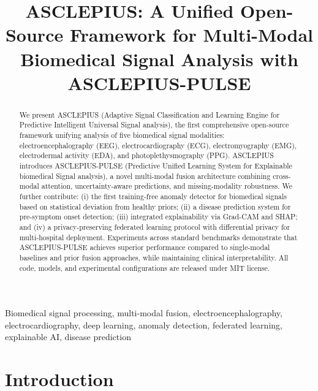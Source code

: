 \documentclass[journal]{IEEEtran}
\begin{document}
\title{ASCLEPIUS: A Unified Open-Source Framework for Multi-Modal\\
Biomedical Signal Analysis with ASCLEPIUS-PULSE}

\author{
}

\maketitle

\begin{abstract}
We present ASCLEPIUS (Adaptive Signal Classification and Learning Engine for
Predictive Intelligent Universal Signal analysis), the first comprehensive
open-source framework unifying analysis of five biomedical signal modalities:
electroencephalography (EEG), electrocardiography (ECG), electromyography
(EMG), electrodermal activity (EDA), and photoplethysmography (PPG).
ASCLEPIUS introduces ASCLEPIUS-PULSE (Predictive Unified Learning System for
Explainable biomedical Signal analysis), a novel multi-modal fusion
architecture combining cross-modal attention, uncertainty-aware predictions,
and missing-modality robustness. We further contribute: (i) the first
training-free anomaly detector for biomedical signals based on statistical
deviation from healthy priors; (ii) a disease prediction system for
pre-symptom onset detection; (iii) integrated explainability via Grad-CAM
and SHAP; and (iv) a privacy-preserving federated learning protocol with
differential privacy for multi-hospital deployment. Experiments across
standard benchmarks demonstrate that ASCLEPIUS-PULSE achieves superior
performance compared to single-modal baselines and prior fusion approaches,
while maintaining clinical interpretability. All code, models, and
experimental configurations are released under MIT license.
\end{abstract}

\begin{IEEEkeywords}
Biomedical signal processing, multi-modal fusion, electroencephalography,
electrocardiography, deep learning, anomaly detection, federated learning,
explainable AI, disease prediction
\end{IEEEkeywords}

\section{Introduction}
\label{sec:intro}
\end{document}
